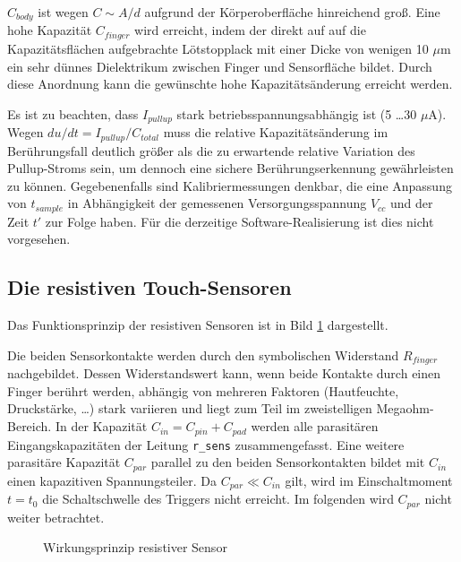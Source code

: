 \documentclass{clt2012}
\renewcommand{\figurename}{Bild}
\begin{document}
$C_{body}$ ist wegen $C \sim A/d$ aufgrund der Körperoberfläche hinreichend groß. Eine hohe Kapazität $C_{finger}$ wird erreicht,
indem der direkt auf auf die Kapazitätsflächen aufgebrachte Lötstopplack mit einer Dicke von wenigen 10 $\mu$m ein sehr dünnes Dielektrikum zwischen Finger und Sensorfläche bildet. Durch diese Anordnung kann die gewünschte hohe Kapazitätsänderung erreicht werden.

Es ist zu beachten, dass $I_{pullup}$ stark betriebsspannungsabhängig ist (5 \dots 30 $\mu$A). Wegen $du/dt = I_{pullup}/C_{total}$ muss die relative Kapazitätsänderung im Berührungsfall deutlich größer als die zu erwartende relative Variation des Pullup-Stroms sein,
um dennoch eine sichere Berührungserkennung gewährleisten zu können. 
Gegebenenfalls sind Kalibriermessungen denkbar, die eine Anpassung von $t_{sample}$ in Abhängigkeit der gemessenen Versorgungsspannung $V_{cc}$ und der Zeit $t'$ zur Folge haben. Für die derzeitige Software-Realisierung ist dies nicht vorgesehen.

\subsection*{Die resistiven Touch-Sensoren}

Das Funktionsprinzip der resistiven Sensoren ist in \figurename{} \ref{fig:ressense} dargestellt. 

Die beiden Sensorkontakte werden durch den symbolischen Widerstand $R_{finger}$ nachgebildet. Dessen Widerstandswert kann,
wenn beide Kontakte durch einen Finger berührt werden, abhängig von mehreren Faktoren (Hautfeuchte, Druckstärke, \dots)
stark variieren und liegt zum Teil im zweistelligen Megaohm-Bereich. In der Kapazität $C_{in}=C_{pin} + C_{pad}$ werden
alle parasitären Eingangskapazitäten der Leitung \texttt{r\_sens} zusammengefasst. Eine weitere parasitäre Kapazität
$C_{par}$ parallel zu den beiden Sensorkontakten bildet mit $C_{in}$ einen kapazitiven
Spannungsteiler. Da $C_{par} \ll  C_{in}$ gilt, wird im Einschaltmoment $t=t_0$ die
Schaltschwelle des Triggers nicht erreicht. Im folgenden wird $C_{par}$ nicht weiter betrachtet.

\begin{figure}[hbt]
\centering
{}
\caption{Wirkungsprinzip resistiver Sensor}
\label{fig:ressense}
\end{figure}
\end{document}
